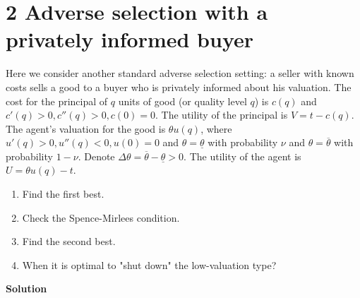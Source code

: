 \documentclass[a4paper]{article}
\begin{document}
\section*{2 Adverse selection with a privately informed buyer}
	Here we consider another standard adverse selection setting: a seller with known costs
	sells a good to a buyer who is privately informed about his valuation.
	The cost for the principal of $q$ units of good (or quality level $q$) is $c(q)$ and $c'(q) >
	0, c''(q) > 0, c(0) = 0$. The utility of the principal is $V = t-c(q)$. The agent's valuation
	for the good is $\theta u(q)$, where $u'(q) > 0, u''(q) < 0, u(0) = 0$ and $\theta = \underline{\theta}$ with probability
	$\nu$ and $\theta = \overline{\theta}$ with probability $1-\nu$. Denote $\Delta \theta = \overline{\theta}- \underline{\theta}> 0$. The utility of the agent is $U = \theta u(q) - t$.
	\begin{enumerate}
	\item Find the first best.
	\item Check the Spence-Mirlees condition.
	\item Find the second best.
	\item When it is optimal to "shut down" the low-valuation type?
	\end{enumerate}

\textbf{Solution}
\end{document}

